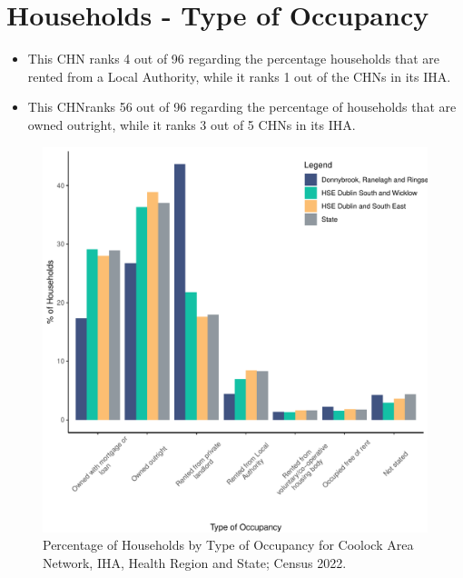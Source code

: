 \documentclass{article}
\begin{document}
\section{Households - Type of Occupancy}\label{sect:Households}
\begin{itemize}
\item This CHN ranks  4 out of 96 regarding the percentage households that are rented from a Local Authority, while it ranks  1 out of the CHNs in its IHA. 
\item This CHNranks  56 out of 96 regarding the percentage of households that are owned outright, while it ranks   3 out of 5 CHNs in its IHA.
\end{itemize}
\begin{figure}[H]
	\centering
	\includegraphics[width = 140mm]{../figures/HouseholdsED.pdf}
	\caption{Percentage of Households by Type of Occupancy for Coolock Area Network, IHA, Health Region and State; Census 2022.}
	\label{fig:vbnv}
	\end{figure}
\end{document}
